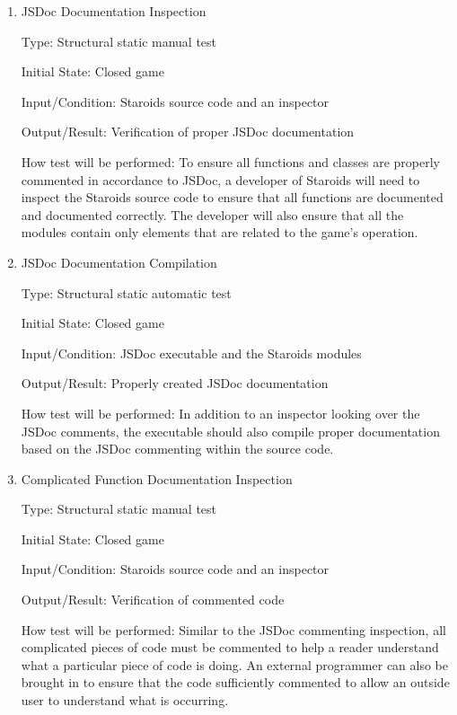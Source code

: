 \documentclass[12pt, titlepage]{article}
\begin{document}
\begin{enumerate}

\item{JSDoc Documentation Inspection\\}

Type: Structural static manual test

Initial State: Closed game

Input/Condition: Staroids source code and an inspector

Output/Result: Verification of proper JSDoc documentation

How test will be performed: To ensure all functions and classes are properly commented in accordance to JSDoc, a developer of Staroids will need to inspect the Staroids source code to ensure that all functions are documented and documented correctly. The developer will also ensure that all the modules contain only elements that are related to the game's operation.

\item{JSDoc Documentation Compilation\\}

Type: Structural static automatic test

Initial State: Closed game

Input/Condition: JSDoc executable and the Staroids modules

Output/Result: Properly created JSDoc documentation

How test will be performed: In addition to an inspector looking over the JSDoc comments, the executable should also compile proper documentation based on the JSDoc commenting within the source code.

\item{Complicated Function Documentation Inspection\\}

Type: Structural static manual test

Initial State: Closed game

Input/Condition: Staroids source code and an inspector

Output/Result: Verification of commented code

How test will be performed: Similar to the JSDoc commenting inspection, all complicated pieces of code must be commented to help a reader understand what a particular piece of code is doing. An external programmer can also be brought in to ensure that the code sufficiently commented to allow an outside user to understand what is occurring.

\end{enumerate}
\end{document}
